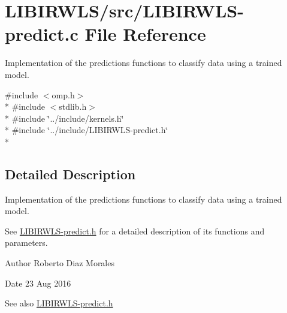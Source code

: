 \hypertarget{LIBIRWLS-predict_8c}{}\section{L\+I\+B\+I\+R\+W\+L\+S/src/\+L\+I\+B\+I\+R\+W\+L\+S-\/predict.c File Reference}
\label{LIBIRWLS-predict_8c}


Implementation of the predictions functions to classify data using a trained model.  


{\ttfamily \#include $<$omp.\+h$>$}\\*
{\ttfamily \#include $<$stdlib.\+h$>$}\\*
{\ttfamily \#include \char`\"{}../include/kernels.\+h\char`\"{}}\\*
{\ttfamily \#include \char`\"{}../include/\+L\+I\+B\+I\+R\+W\+L\+S-\/predict.\+h\char`\"{}}\\*


\subsection{Detailed Description}
Implementation of the predictions functions to classify data using a trained model. 

See \hyperlink{LIBIRWLS-predict_8h}{L\+I\+B\+I\+R\+W\+L\+S-\/predict.\+h} for a detailed description of its functions and parameters.

\begin{DoxyAuthor}{Author}
Roberto Diaz Morales 
\end{DoxyAuthor}
\begin{DoxyDate}{Date}
23 Aug 2016
\end{DoxyDate}
\begin{DoxySeeAlso}{See also}
\hyperlink{LIBIRWLS-predict_8h}{L\+I\+B\+I\+R\+W\+L\+S-\/predict.\+h} 
\end{DoxySeeAlso}
